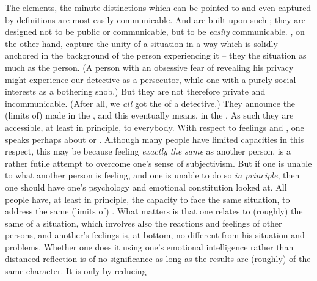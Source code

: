 The  elements, the minute distinctions which can be
pointed to and even captured by  definitions are most easily
communicable. And  are built upon such ; they are
designed not to be public or communicable, but to be {\em easily} communicable.
 , on the other hand, capture the unity of a
situation in a way which is solidly anchored in the background of the person
experiencing it -- they  the situation as much as the person.  (A
person with an obsessive fear of revealing his privacy might experience our
detective as a persecutor, while one with a purely social interests as a
bothering snob.)  But they are not therefore private and incommunicable.  (After
all, we {\em all} got the  of a detective.)  They announce the
(limits of)  made in the , and this eventually
means, in the .  As such they are accessible, at least in principle, to
everybody.
With respect to feelings and , one speaks perhaps about 
or . Although many people have limited capacities in this respect,
this may be because feeling {\em exactly the same} as another person, is a
rather futile attempt to overcome one's sense of  subjectivism.
But if one is unable to  what another person is feeling, and one
is unable to do so {\em in principle}, then one should have one's psychology and
emotional constitution looked at.  All people have, at least in principle, the
capacity to face the same situation, to address the same (limits of)
. What matters is that one relates to (roughly) the same
 of a situation, which involves also the reactions and feelings of
other persons, and  another's feelings is, at bottom, no different
from  his situation and problems. Whether one does it using one's
emotional intelligence rather than distanced reflection is of no significance as
long as the results are (roughly) of the same character. It is only by reducing
